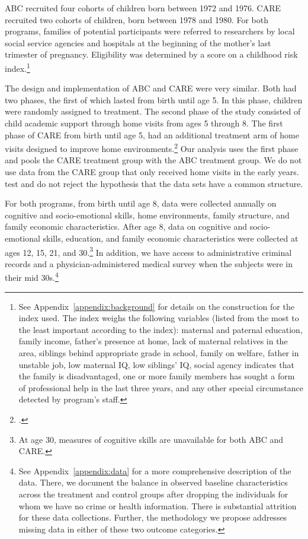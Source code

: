 ABC recruited four cohorts of children born between 1972 and 1976. CARE recruited two cohorts of children, born between 1978 and 1980. For both programs, families of potential participants were referred to researchers by local social service agencies and hospitals at the beginning of the mother's last trimester of pregnancy. Eligibility was determined by a score on a childhood risk index.\footnote{See  Appendix~\ref{appendix:background} for details on the construction for the index used. The index weighs the following variables (listed from the most to the least important according to the index): maternal and paternal education, family income, father's presence at home, lack of maternal relatives in the area, siblings behind appropriate grade in school, family on welfare, father in unstable job, low maternal IQ, low siblings' IQ, social agency indicates that the family is disadvantaged, one or more family members has sought a form of professional help in the last three years, and any other special circumstance detected by program's staff.} 

The design and implementation of ABC and CARE were very similar. Both had two phases, the first of which lasted from birth until age 5. In this phase, children were randomly assigned to treatment. The second phase of the study consisted of child academic support through home visits from ages 5 through 8. The first phase of CARE from birth until age 5, had an additional treatment arm of home visits designed to improve home environments.\footnote{\citet{Wasik_Ramey_etal_1990_CD}.} Our analysis uses the first phase and pools the CARE treatment group with the ABC treatment group. We do not use data from the CARE group that only received home visits in the early years. \cite{Campbell_Conti_etal_2014_EarlyChildhoodInvestments} test and do not reject the hypothesis that the data sets have a common structure.

For both programs, from birth until age 8, data were collected annually on cognitive and socio-emotional skills, home environments, family structure, and family economic characteristics. After age 8, data on cognitive and socio-emotional skills, education, and family economic characteristics were collected at ages 12, 15, 21, and 30.\footnote{At age 30, measures of cognitive skills are unavailable for both ABC and CARE.} In addition, we have access to administrative criminal records and a physician-administered medical survey when the subjects were in their mid 30s.\footnote{See  Appendix~\ref{appendix:data} for a more comprehensive description of the data. There, we document the balance in observed baseline characteristics across the treatment and control groups after dropping the individuals for whom we have no crime or health information. There is substantial attrition for these data collections. Further, the methodology we propose addresses missing data in either of these two outcome categories.}

